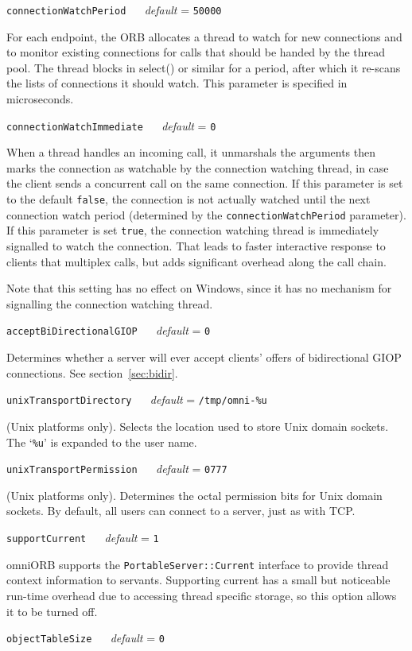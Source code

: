 \documentclass[11pt,oneside,a4paper]{book}
\makeatletter
\newcommand{\type}[1]{\texttt{#1}}
\newcommand{\code}[1]{\texttt{#1}}
\newcommand{\confopt}[2]
  {\vspace{\baselineskip}\par\noindent\code{#1} ~~ \textit{default} =
   \code{#2}}
\renewcommand{\confopt}[2]
  {\vspace{\baselineskip}\par\noindent\code{#1} ~~ \textit{default} =
   \code{#2}\\[-1ex]\@afterheading}
\makeatother
\begin{document}
\confopt{connectionWatchPeriod}{50000}

For each endpoint, the ORB allocates a thread to watch for new
connections and to monitor existing connections for calls that should
be handed by the thread pool. The thread blocks in select() or similar
for a period, after which it re-scans the lists of connections it
should watch. This parameter is specified in microseconds.


\confopt{connectionWatchImmediate}{0}

When a thread handles an incoming call, it unmarshals the arguments
then marks the connection as watchable by the connection watching
thread, in case the client sends a concurrent call on the same
connection. If this parameter is set to the default \code{false}, the
connection is not actually watched until the next connection watch
period (determined by the \code{connectionWatchPeriod} parameter).  If
this parameter is set \code{true}, the connection watching thread is
immediately signalled to watch the connection. That leads to faster
interactive response to clients that multiplex calls, but adds
significant overhead along the call chain.

Note that this setting has no effect on Windows, since it has no
mechanism for signalling the connection watching thread.


\confopt{acceptBiDirectionalGIOP}{0}

Determines whether a server will ever accept clients' offers of
bidirectional GIOP connections. See section~\ref{sec:bidir}.


\confopt{unixTransportDirectory}{/tmp/omni-\%u}

(Unix platforms only). Selects the location used to store Unix domain
sockets. The `\code{\%u}' is expanded to the user name.


\confopt{unixTransportPermission}{0777}

(Unix platforms only). Determines the octal permission bits for Unix
domain sockets. By default, all users can connect to a server, just as
with TCP.


\confopt{supportCurrent}{1}

omniORB supports the \type{PortableServer::Current} interface to
provide thread context information to servants. Supporting current has
a small but noticeable run-time overhead due to accessing thread
specific storage, so this option allows it to be turned off.


\confopt{objectTableSize}{0}
\end{document}
